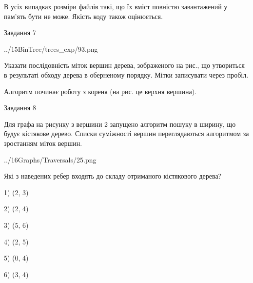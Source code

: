 \documentclass[12pt, ukrainian]{article}
\begin{document}
{В усіх випадках розміри файлів такі, що їх вміст повністю завантажений у пам'ять бути не може. Якість коду також оцінюється.



\vspace{10mm}\par

\newpage
\begin{minipage}[t]{9.7cm}
               
{\begin{center}Завдання {7}\end{center}}
\vspace{-4mm}

\begin{center}
	{../15BinTree/trees_exp/93.png}
\end{center}
Указати послідовність міток вершин дерева, зображеного на рис., що утвориться в результаті обходу дерева в оберненому порядку. Мітки записувати через пробіл.\par Алгоритм починає роботу з кореня (на рис. це верхня вершина).\par

\end{minipage}
\vline \hspace{8mm}
\begin{minipage}[t]{8.0cm}
               
{\begin{center}Завдання {8}\end{center}}
\vspace{-4mm}
Для графа на рисунку з вершини 2 запущено алгоритм пошуку в ширину, що будує кістякове дерево. Списки суміжності вершин переглядаються алгоритмом за зростанням міток вершин.\par
\begin{center}
	{../16Graphs/Traversals/25.png}
\end{center}
\par Які з наведених ребер входять до складу отриманого кістякового дерева?\par
1) (2, 3)\par
2) (2, 4)\par
3) (5, 6)\par
4) (2, 5)\par
5) (0, 4)\par
6) (3, 4)\par
{\vskip 15pt} \par


\end{minipage}}
\end{document}
